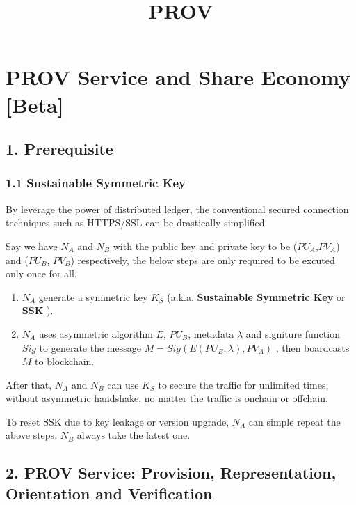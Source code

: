 \documentclass[11pt]{article}
\title{PROV}
\providecommand{\tightlist}{%
      \setlength{\itemsep}{0pt}\setlength{\parskip}{0pt}}
\begin{document}
    
    
    \maketitle
    
    

    
    \section{PROV Service and Share Economy
{[}Beta{]}}\label{prov-service-and-share-economy-beta}

\subsection{1. Prerequisite}\label{prerequisite}

\subsubsection{1.1 Sustainable Symmetric
Key}\label{sustainable-symmetric-key}

By leverage the power of distributed ledger, the conventional secured
connection techniques such as HTTPS/SSL can be drastically simplified.

Say we have \(N_A\) and \(N_B\) with the public key and private key to
be (\(PU_A\),\(PV_A\)) and (\(PU_B\), \(PV_B\)) respectively, the below
steps are only required to be excuted only once for all.

\begin{enumerate}
\def\labelenumi{\arabic{enumi}.}
\tightlist
\item
  \(N_A\) generate a symmetric key \(K_S\) (a.k.a. \textbf{Sustainable
  Symmetric Key} or \textbf{SSK} ).
\item
  \(N_A\) uses asymmetric algorithm \(E\), \(PU_B\), metadata
  \(\lambda\) and signiture function \(Sig\) to generate the message
  \(M = Sig(E(PU_B, \lambda),PV_A)\) , then boardcasts \(M\) to
  blockchain.
\end{enumerate}

After that, \(N_A\) and \(N_B\) can use \(K_S\) to secure the traffic
for unlimited times, without asymmetric handshake, no matter the traffic
is onchain or offchain.

To reset SSK due to key leakage or version upgrade, \(N_A\) can simple
repeat the above steps. \(N_B\) always take the latest one.

\subsection{2. PROV Service: Provision, Representation, Orientation and
Verification}\label{prov-service-provision-representation-orientation-and-verification}
\end{document}
